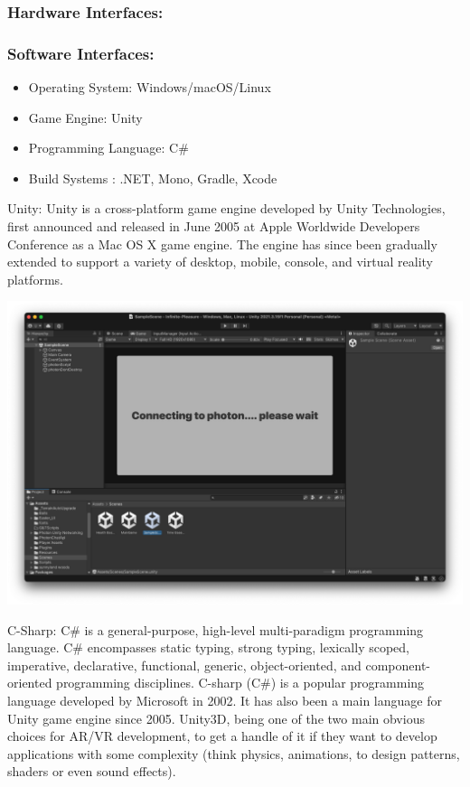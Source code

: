 \documentclass[12pt]{report}
\begin{document}
\subsubsection{ Hardware Interfaces:}
\normalsize



\subsubsection{ Software Interfaces:}
\normalsize
\begin{itemize}
\item Operating System: Windows/macOS/Linux 

\item Game Engine: Unity 

\item Programming Language: C\#

\item Build Systems : .NET, Mono, Gradle, Xcode

\end{itemize}

\centering
\justifying
\setlength{\parindent}{0em}
\renewcommand{\baselinestretch}{1.5}
Unity: Unity is a cross-platform game engine developed by Unity Technologies, 
first announced and released in June 2005 at Apple Worldwide Developers Conference as a Mac OS X game engine.
The engine has since been gradually extended to support a variety of desktop, mobile, console, and virtual reality platforms.

\setlength{\parindent}{0em}
\includegraphics[scale=0.2]{Haar.png}

C-Sharp: C\# is a general-purpose, high-level multi-paradigm programming language. C\# encompasses static typing, strong typing, lexically scoped, imperative, declarative, functional, generic, object-oriented, and component-oriented programming disciplines. C-sharp (C\#) is a popular programming language developed by Microsoft in 2002. It has also been a main language for Unity game engine since 2005. Unity3D, being one of the two main obvious choices for AR/VR development, to get a handle of it if they want to develop applications with some complexity (think physics, animations, to design patterns, shaders or even sound effects).
\end{document}
